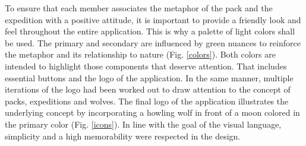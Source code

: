 \documentclass[12pt,numbers=noenddot,parskip,bibliography=totocnumbered,listof=totocnumbered,draft]{scrreprt}
\begin{document}
To ensure that each member associates the metaphor of the pack and the expedition with a positive attitude, it is important to provide a friendly look and feel throughout the entire application. This is why a palette of light colors shall be used. The primary and secondary are influenced by green nuances to reinforce the metaphor and its relationship to nature (Fig. \ref{colors}). Both colors are intended to highlight those components that deserve attention. That includes essential buttons and the logo of the application. In the same manner, multiple iterations of the logo had been worked out to draw attention to the concept of packs, expeditions and wolves. The final logo of the application illustrates the underlying concept by incorporating a howling wolf in front of a moon colored in the primary color (Fig. \ref{icons}). In line with the goal of the visual language, simplicity and a high memorability were respected in the design.
\end{document}

